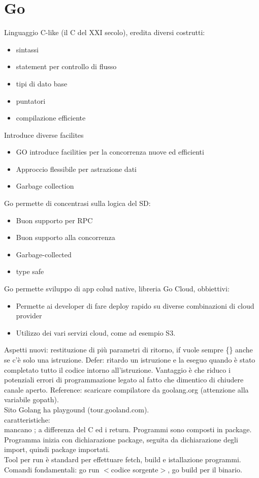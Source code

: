 \documentclass[16px]{article}
\begin{document}
\section{Go}
Linguaggio C-like (il C del XXI secolo), eredita diversi costrutti:
\begin{itemize}
\item sintassi
\item statement per controllo di flusso
\item tipi di dato base
\item puntatori
\item compilazione efficiente
\end{itemize}
Introduce diverse facilites
\begin{itemize}
\item GO introduce facilities per la concorrenza nuove ed efficienti
\item Approccio flessibile per astrazione dati
\item Garbage collection
\end{itemize}
Go permette di concentrasi sulla logica del SD:
\begin{itemize}
\item Buon supporto per RPC
\item Buon supporto alla concorrenza
\item Garbage-collected
\item type safe
\end{itemize}
Go permette sviluppo di app colud native, libreria Go Cloud, obbiettivi:
\begin{itemize}
\item Permette ai developer di fare deploy rapido su diverse combinazioni di cloud provider
\item Utilizzo dei vari servizi cloud, come ad esempio S3.
\end{itemize}
Aspetti nuovi: restituzione di più parametri di ritorno, if vuole sempre \{\} anche se c'è solo una istruzione. Defer: ritardo un istruzione e la eseguo quando è stato completato tutto il codice intorno all'istruzione. Vantaggio è che riduco i potenziali errori di programmazione legato al fatto che dimentico di chiudere canale aperto.
Reference: scaricare compilatore da goolang.org (attenzione alla variabile gopath).\\ Sito Golang ha playgound (tour.gooland.com).\\ caratteristiche:\\ mancano ; a differenza del C ed i return. Programmi sono composti in package. Programma inizia con dichiarazione package, seguita da dichiarazione degli import, quindi package importati.\\ Tool per run è standard per effettuare fetch, build e istallazione programmi.\\ Comandi fondamentali: go run $<$codice sorgente$>$, go build per il binario.
\end{document}
